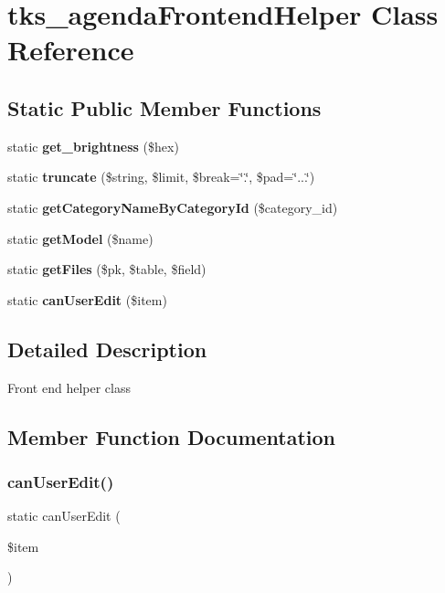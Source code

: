 \section{tks\+\_\+agenda\+Frontend\+Helper Class Reference}
\label{classtks__agenda_frontend_helper}
\subsection*{Static Public Member Functions}
\begin{DoxyCompactItemize}
\item 
static \textbf{ get\+\_\+brightness} (\$hex)
\item 
static \textbf{ truncate} (\$string, \$limit, \$break=\char`\"{}.\char`\"{}, \$pad=\char`\"{}...\char`\"{})
\item 
static \textbf{ get\+Category\+Name\+By\+Category\+Id} (\$category\+\_\+id)
\item 
static \textbf{ get\+Model} (\$name)
\item 
static \textbf{ get\+Files} (\$pk, \$table, \$field)
\item 
static \textbf{ can\+User\+Edit} (\$item)
\end{DoxyCompactItemize}


\subsection{Detailed Description}
Front end helper class 

\subsection{Member Function Documentation}
\mbox{\label{classtks__agenda_frontend_helper_ab4dfb05f0946b8e09ec4738efcc804fa}} 
\subsubsection{can\+User\+Edit()}
{\footnotesize\ttfamily static can\+User\+Edit (\begin{DoxyParamCaption}\item[{}]{\$item }\end{DoxyParamCaption})\hspace{0.3cm}{\ttfamily [static]}}

